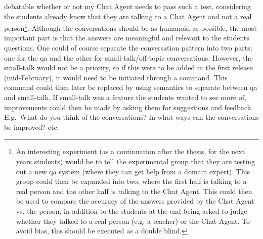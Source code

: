 debatable whether or not my Chat Agent needs to pass such a test, considering the students already know that they are talking to a Chat Agent and not a real person\footnote{An 
	interesting experiment (as a continuation after the thesis, for the next years students) would be to tell the experimental group that they are 
	testing out a new \gls{qa} system (where they can get help from a domain expert). This group could then be expanded into two, where the first half is talking to a real 
	person and the other half is talking to the Chat Agent. This could then be used to compare the accuracy of the answers provided by the Chat Agent vs. the person, in addition 
	to the students at the end being asked to judge whether they talked to a real person (e.g. a teacher) or the Chat Agent. To avoid bias, this should be executed as a double 
	blind.}.
Although the conversations should be as humanoid as possible, the most important part is that the answers are meaningful and relevant to the students questions.
\vspace{0.5em}\newline
One could of course separate the conversation pattern into two parts; one for the \gls{qa} and the other for small-talk/off-topic conversations. However, the small-talk would  
not be a priority, so if this were to be added in the first release (mid-February), it would need to be initiated through a command. This command could then later be replaced by 
using semantics to separate between \gls{qa} and small-talk. If small-talk was a feature the students wanted to see more of, improvements could then be made by asking them for 
suggestions and feedback. E.g.~What do you think of the conversations? In what ways can the conversations be improved? etc.


